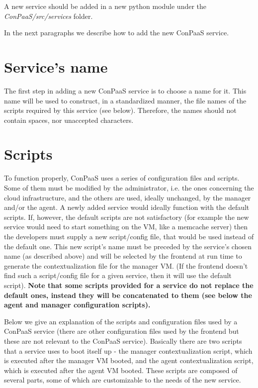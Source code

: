 \documentclass[10pt]{article}
\begin{document}
A new service should be added in a new python module under the \textit{ConPaaS/src/services} folder. \\


In the next paragraphs we describe how to add the new ConPaaS service.

\section{Service's name}

The first step in adding a new ConPaaS service is to choose a name for it. This name will be used to construct, in a standardized manner, the file names of the scripts required by this service (see below). Therefore, the names should not contain spaces, nor unaccepted characters. 

\section{Scripts}
To function properly, ConPaaS uses a series of configuration files and scripts. Some of them must be modified by the administrator, i.e. the ones concerning the cloud infrastructure, and the others are used, ideally unchanged, by the manager and/or the agent. A newly added service would ideally function with the default scripts. If, however, the default scripts are not satisfactory (for example the new service would need to start something on the VM, like a memcache server) then the developers must supply a new script/config file, that would be used instead of the default one. This new script's name must be preceded by the service's chosen name (as described above) and will be selected by the frontend at run time to generate the contextualization file for the manager VM. (If the frontend doesn't find such a script/config file for a given service, then it will use the default script). \textbf{Note that some scripts provided for a service do not replace the default ones, instead they will be concatenated to them (see below the agent and manager configuration scripts).}

Below we give an explanation of the scripts and configuration files used by a ConPaaS service (there are other configuration files used by the frontend but these are not relevant to the ConPaaS service). Basically there are two scripts that a service uses to boot itself up - the manager contextualization script, which is executed after the manager VM booted, and the agent contextualization script, which is executed after the agent VM booted. These scripts are composed of several parts, some of which are customizable to the needs of the new service.      
\end{document}
